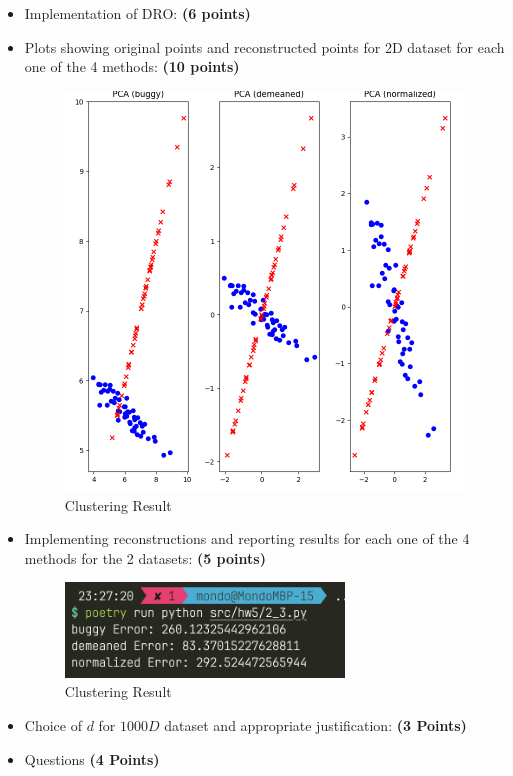 \documentclass[a4paper]{article}
\theoremstyle{definition}
\begin{document}
\begin{itemize}
\begin{itemize}
		      \item Implementation of DRO: \textbf{(6 points)}
		      \item Plots showing original points and reconstructed points for 2D dataset for each one of the 4 methods: \textbf{(10 points)}
		            \begin{figure}[H]
			            \centering
			            \includegraphics[width=1\textwidth]{img/2_3_1.png}
			            \caption*{Clustering Result}
		            \end{figure}

		      \item Implementing reconstructions and reporting results for each one of the 4 methods for the 2 datasets: \textbf{(5 points)}
		            \begin{figure}[H]
			            \centering
			            \includegraphics[width=0.7\textwidth]{img/2_3_2.png}
			            \caption*{Clustering Result}
		            \end{figure}
		      \item Choice of $d$ for $1000D$ dataset and appropriate justification:
		            \textbf{(3 Points)}
		      \item Questions \textbf{(4 Points)}
	      \end{itemize}

\end{itemize}
\end{document}
